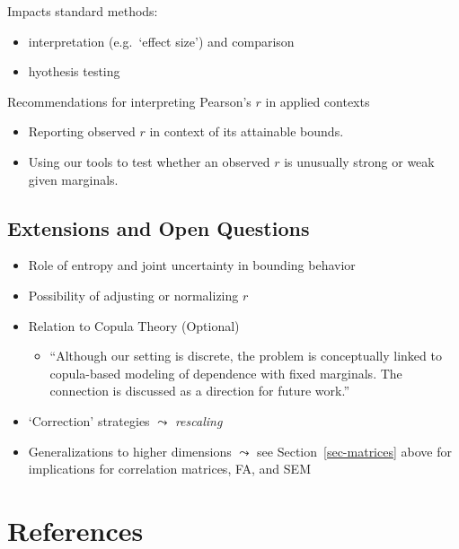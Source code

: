 \documentclass[
  12pt,
]{article}
\providecommand{\tightlist}{%
  \setlength{\itemsep}{0pt}\setlength{\parskip}{0pt}}
\theoremstyle{plain}
\theoremstyle{definition}
\theoremstyle{remark}
\begin{document}
Impacts standard methods:

\begin{itemize}
\tightlist
\item
  interpretation (e.g.~`effect size') and comparison
\item
  hyothesis testing
\end{itemize}

Recommendations for interpreting Pearson's \(r\) in applied contexts

\begin{itemize}
\tightlist
\item
  Reporting observed \(r\) in context of its attainable bounds.
\item
  Using our tools to test whether an observed \(r\) is unusually strong
  or weak given marginals.
\end{itemize}

\subsection{Extensions and Open
Questions}\label{extensions-and-open-questions}

\begin{itemize}
\tightlist
\item
  Role of entropy and joint uncertainty in bounding behavior\\
\item
  Possibility of adjusting or normalizing \(r\)
\item
  Relation to Copula Theory (Optional)

  \begin{itemize}
  \tightlist
  \item
    ``Although our setting is discrete, the problem is conceptually
    linked to copula-based modeling of dependence with fixed marginals.
    The connection is discussed as a direction for future work.''
  \end{itemize}
\item
  `Correction' strategies \(\leadsto\) \emph{rescaling}
\item
  Generalizations to higher dimensions \(\leadsto\) see
  Section~\ref{sec-matrices} above for implications for correlation
  matrices, FA, and SEM
\end{itemize}

\newpage

\section{References}\label{references}
\end{document}
